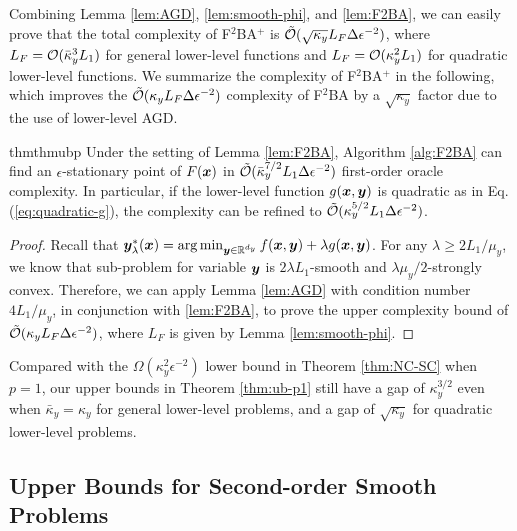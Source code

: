 \documentclass{article}
\begin{document}
Combining Lemma \ref{lem:AGD}, \ref{lem:smooth-phi}, and \ref{lem:F2BA}, we can easily prove that the total complexity of F${}^2$BA${}^+$ is $\tilde {{\mathcal{O}}}(\sqrt{\kappa_y} L_F \Delta \epsilon^{-2})$,
where $L_F = {\mathcal{O}}(\bar \kappa_y^3 L_1)$ for general lower-level functions and $L_F = {\mathcal{O}}(\kappa_y^2 L_1) $ for quadratic lower-level functions. We summarize the complexity of F${}^2$BA${}^+$ in the following, which improves the $\tilde {{\mathcal{O}}}(\kappa_y L_F \Delta \epsilon^{-2})$
complexity of F${}^2$BA \citep{chen2023near}
 by a $\sqrt{\kappa_y}$ factor due to the use of lower-level AGD. 



\begin{restatable}{thm}{thmubp}  \label{thm:ub-p1}
Under the setting of Lemma \ref{lem:F2BA}, Algorithm \ref{alg:F2BA} can find an
$\epsilon$-stationary point of $F({\bm{x}})$ in 
$\tilde {{\mathcal{O}}} ( \bar \kappa_y^{7/2} L_1 \Delta \epsilon^{-2}  )$
first-order oracle complexity. In particular, if the lower-level function  $g({\bm{x}},{\bm{y}})$ is quadratic as in Eq.  (\ref{eq:quadratic-g}), the complexity can be refined to $\tilde {{\mathcal{O}}} ( \kappa_y^{5/2} L_1 \Delta \epsilon^{-2}  )$.
\end{restatable}

\begin{proof}
Recall that ${\bm{y}}_\lambda^*({\bm{x}}) = \arg \min_{{\bm{y}} \in {\mathbb{R}}^{d_y}} f({\bm{x}},{\bm{y}}) + \lambda g({\bm{x}},{\bm{y}})$. For any $\lambda \ge 2 L_1/ \mu_y$, we know that sub-problem for variable ${\bm{y}}$ is $2\lambda L_1$-smooth and $\lambda \mu_y/2$-strongly convex. Therefore, we can apply Lemma \ref{lem:AGD} with condition number $4 L_1 / \mu_y$, in conjunction with \ref{lem:F2BA}, to prove the upper complexity bound of $\tilde {{\mathcal{O}}}(\kappa_y L_F \Delta \epsilon^{-2})$, where $L_F$ is given by Lemma \ref{lem:smooth-phi}.
\end{proof}

Compared with the $\Omega(\kappa_y^2 \epsilon^{-2})$ lower bound in 
Theorem \ref{thm:NC-SC} when $p=1$, our upper bounds in Theorem \ref{thm:ub-p1} still have a gap of 
$\kappa_y^{3/2}$ even when $\bar \kappa_y = \kappa_y$ for general lower-level problems, and a gap of $\sqrt{\kappa_y}$ for quadratic lower-level problems.

\subsection{Upper Bounds for Second-order Smooth Problems}
\end{document}
